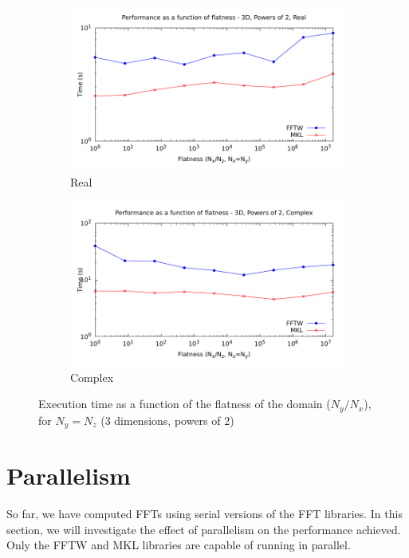 \documentclass[12pt, a4paper]{article} \setlength{\textheight}{24cm}
\begin{document}
\begin{figure}[H]
  \centering
  \begin{subfigure}{.5\textwidth}
    \centering
    \includegraphics[width=.9\linewidth]{graphs/flatness-r.pdf}
    \caption{Real}
    \label{FLATNESSR}
  \end{subfigure}%
  \begin{subfigure}{.5\textwidth}
    \centering
    \includegraphics[width=.9\linewidth]{graphs/flatness-c.pdf}
    \caption{Complex}
    \label{FLATNESSC}
  \end{subfigure}
  \caption{Execution time as a function of the flatness of the domain
    ($N_y/N_x$), for $N_y=N_z$ (3 dimensions, powers of 2)}
  \label{FLATNESS}
\end{figure}

\section{Parallelism}\label{PARALLELISM}
So far, we have computed FFTs using serial versions of the FFT libraries. 
In this section, we
will investigate the effect of parallelism on the performance
achieved. Only the FFTW and MKL libraries are capable of running in
parallel.
\end{document}
